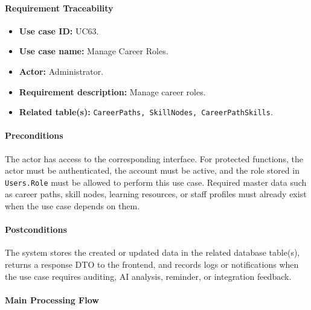 \paragraph{Requirement Traceability}

\begin{itemize}
    \item \textbf{Use case ID:} UC63.
    \item \textbf{Use case name:} Manage Career Roles.
    \item \textbf{Actor:} Administrator.
    \item \textbf{Requirement description:} Manage career roles.
    \item \textbf{Related table(s):} \texttt{CareerPaths, SkillNodes, CareerPathSkills}.
\end{itemize}

\paragraph{Preconditions}

The actor has access to the corresponding interface. For protected functions, the actor must be authenticated, the account must be active, and the role stored in \texttt{Users.Role} must be allowed to perform this use case. Required master data such as career paths, skill nodes, learning resources, or staff profiles must already exist when the use case depends on them.

\paragraph{Postconditions}

The system stores the created or updated data in the related database table(s), returns a response DTO to the frontend, and records logs or notifications when the use case requires auditing, AI analysis, reminder, or integration feedback.

\paragraph{Main Processing Flow}

